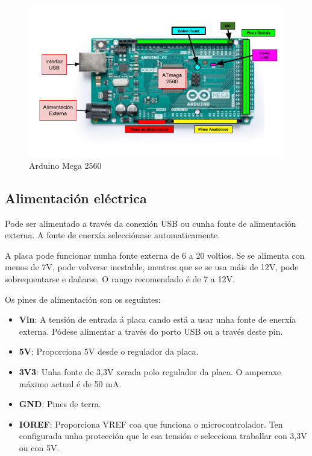 \documentclass[11pt,twoside]{book}
\begin{document}
\begin{figure}[H]
	\begin{center}
		\includegraphics[width=12cm]{images/pinoutMega2560.png}
	\end{center}
	\caption{Arduino Mega 2560 \cite{wArduino}}
	\label{fig:ArduinoMega}
\end{figure}

\subsection{Alimentación eléctrica}

Pode ser alimentado a través da conexión USB ou cunha fonte de alimentación externa. A fonte de enerxía selecciónase automaticamente. 

A placa pode funcionar nunha fonte externa de 6 a 20 voltios. Se se alimenta con menos de 7V, pode volverse inestable, mentres que se se usa máis de 12V, pode sobrequentarse e dañarse. O rango recomendado é de 7 a 12V.

Os pines de alimentación son os seguintes:

\begin{itemize}
\item \textbf{Vin}: A tensión de entrada á placa cando está a usar unha fonte de enerxía externa. Pódese alimentar a través do porto USB ou a través deste pin.
\item \textbf{5V}: Proporciona 5V desde o regulador da placa.
\item \textbf{3V3}: Unha fonte de 3,3V xerada polo regulador da placa. O amperaxe máximo actual é de 50 mA.
\item \textbf{GND}: Pines de terra.
\item \textbf{IOREF}: Proporciona VREF coa que funciona o microcontrolador. Ten configurada unha protección que le esa tensión e selecciona traballar con 3,3V ou con 5V.
\end{itemize}
\end{document}
